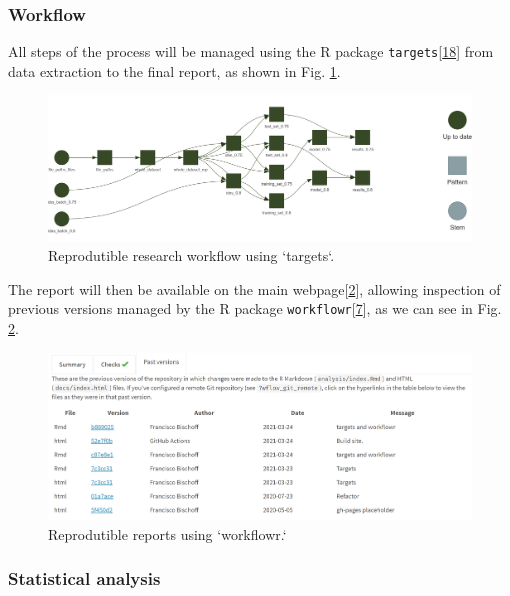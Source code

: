 \documentclass[runningheads]{llncs}
\begin{document}
\hypertarget{workflow}{%
\subsubsection{Workflow}\label{workflow}}

All steps of the process will be managed using the R package
\texttt{targets}{[}\protect\hyperlink{ref-landau2021}{18}{]} from data
extraction to the final report, as shown in Fig. \ref{fig:targets}.

\begin{figure}
\includegraphics[width=1\linewidth]{targets} \caption{Reprodutible research workflow using `targets`.}\label{fig:targets}
\end{figure}

The report will then be available on the main
webpage{[}\protect\hyperlink{ref-franz_website}{2}{]}, allowing
inspection of previous versions managed by the R package
\texttt{workflowr}{[}\protect\hyperlink{ref-workflowr2021}{7}{]}, as we
can see in Fig. \ref{fig:workflow_workflowr}.

\begin{figure}
\includegraphics[width=1\linewidth]{workflowr} \caption{Reprodutible reports using `workflowr.`}\label{fig:workflow_workflowr}
\end{figure}

\hypertarget{statistical-analysis}{%
\subsubsection{Statistical analysis}\label{statistical-analysis}}
\end{document}

